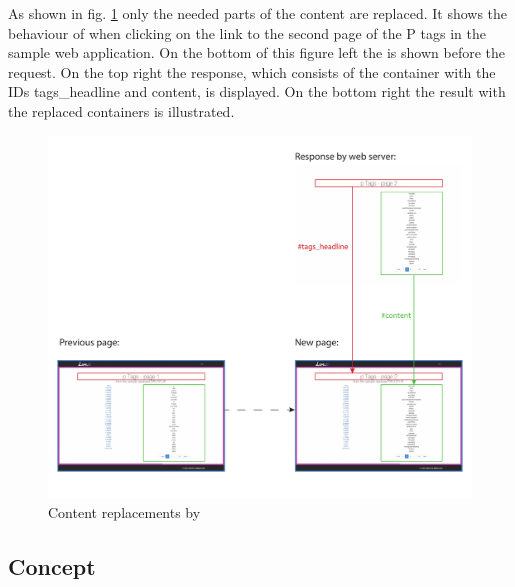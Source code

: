 \noindent{}As shown in fig. \ref{fig:lare_replacements} only the needed parts of the content are replaced.
It shows the behaviour of \lare{} when clicking on the link to the second page of the P tags in the sample web application.
On the bottom of this figure left the \webPage{} is shown before the request.
On the top right the response, which consists of the container with the IDs tags\_headline and content, is displayed.
On the bottom right the result with the replaced containers is illustrated.
\newpage{}
\begin{figure}[H]
\centering
\includegraphics[width=14cm]{images/lare_replacements.pdf}
\caption[lare_replacements]{Content replacements by \lare{}}
\label{fig:lare_replacements}
\end{figure}

\subsection{Concept\label{sec:lare_concept}}

